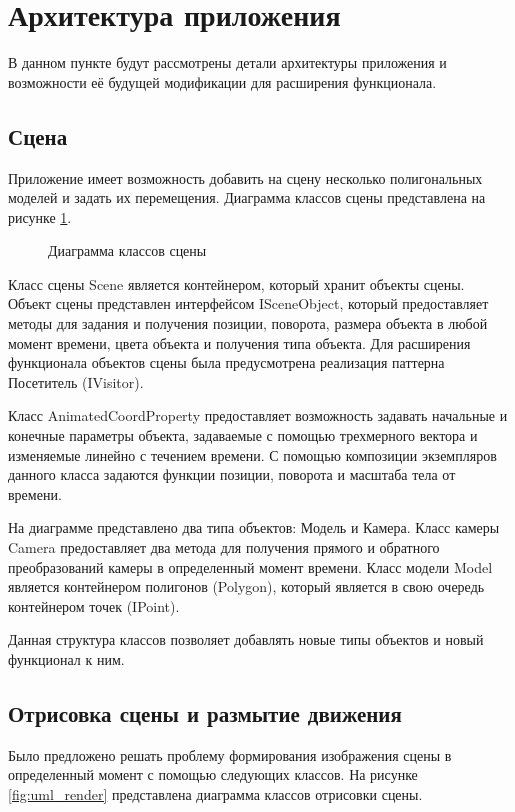 \section{Архитектура приложения}

В данном пункте будут рассмотрены детали архитектуры приложения и возможности её будущей модификации для расширения функционала.

\subsection{Сцена}

Приложение имеет возможность добавить на сцену несколько полигональных моделей и задать их перемещения. Диаграмма классов сцены представлена на рисунке \ref{fig:uml_scene}.

\begin{figure}[h]
    \centering
    
    \caption{Диаграмма классов сцены}
    \label{fig:uml_scene}
\end{figure}

Класс сцены Scene является контейнером, который хранит объекты сцены. Объект сцены представлен интерфейсом ISceneObject, который предоставляет методы для задания и получения позиции, поворота, размера объекта в любой момент времени, цвета объекта и получения типа объекта. Для расширения функционала объектов сцены была предусмотрена реализация паттерна Посетитель (IVisitor).

Класс AnimatedCoordProperty предоставляет возможность задавать начальные и конечные параметры объекта, задаваемые с помощью трехмерного вектора и изменяемые линейно с течением времени. С помощью композиции экземпляров данного класса задаются функции позиции, поворота и масштаба тела от времени.

На диаграмме представлено два типа объектов: Модель и Камера. Класс камеры Camera предоставляет два метода для получения прямого и обратного преобразований камеры в определенный момент времени. Класс модели Model является контейнером полигонов (Polygon), который является в свою очередь контейнером точек (IPoint).   

Данная структура классов позволяет добавлять новые типы объектов и новый функционал к ним. 

\subsection{Отрисовка сцены и размытие движения}
Было предложено решать проблему формирования изображения сцены в определенный момент с помощью следующих классов. На рисунке \ref{fig:uml_render} представлена диаграмма классов отрисовки сцены.  

